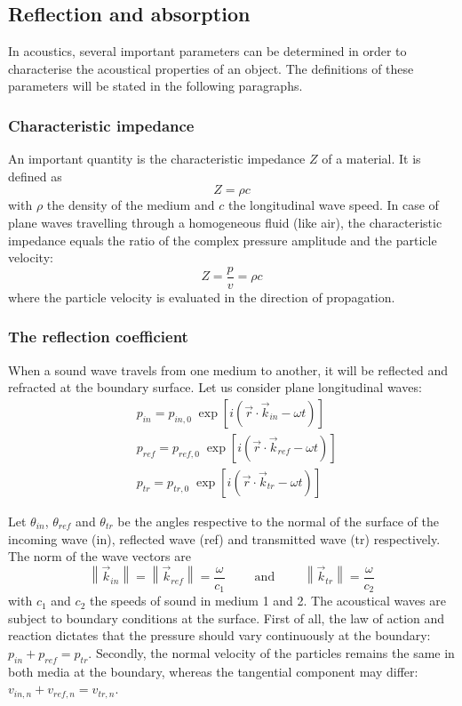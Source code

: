 \subsection{Reflection and absorption}
In acoustics, several important parameters can be determined in order to characterise the acoustical properties of an object. The  definitions of these parameters will be stated in the following paragraphs.


\subsubsection*{Characteristic impedance}
\vspace{-15pt}
An important quantity is the characteristic impedance $Z$ of a material. It is defined as 
\[
Z = \rho c
\]
with $\rho$ the density of the medium and $c$ the longitudinal wave speed. In case of plane waves travelling through a homogeneous fluid (like air), the characteristic impedance equals the ratio of the complex pressure amplitude and the particle velocity:
\[
Z = \frac{p}{v} = \rho c
\]
where the particle velocity is evaluated in the direction of propagation.


\subsubsection*{The reflection coefficient}
\vspace{-15pt}
When a sound wave travels from one medium to another, it will be reflected and refracted at the boundary surface. Let us consider plane longitudinal waves:
\begin{align*}
&p_{in} = p_{in,0}\; \exp\left[ i (\vec{r} \cdot \vec{k}_{in} -  \omega t )\right]\\
&p_{ref} = p_{ref,0}\; \exp\left[ i (\vec{r} \cdot \vec{k}_{ref} -  \omega t )\right]\\
&p_{tr} = p_{tr,0}\; \exp\left[ i (\vec{r} \cdot \vec{k}_{tr} -  \omega t )\right]
\end{align*}

Let $\theta_{in}$, $\theta_{ref}$ and $\theta_{tr}$ be the angles respective to the normal of the surface of the incoming wave (in), reflected  wave (ref) and transmitted  wave (tr) respectively. The norm of the wave vectors are 
\[
\left\|\vec{k}_{in}\right\| = \left\|\vec{k}_{ref}\right\| = \frac{\omega}{c_1} \qquad \textrm{ and } \qquad \left\|\vec{k}_{tr}\right\| = \frac{\omega}{c_2}
\]
with $c_1$ and $c_2$ the speeds of sound in medium 1 and 2. The acoustical waves are subject to boundary conditions at the surface. First of all, the law of action and reaction dictates that the pressure should vary continuously at the boundary: $p_{in} + p_{ref} = p_{tr}$.
Secondly, the normal velocity of the particles remains the same in both media at the boundary, whereas the tangential component may differ: $v_{in,n} + v_{ref,n} = v_{tr,n}$.

